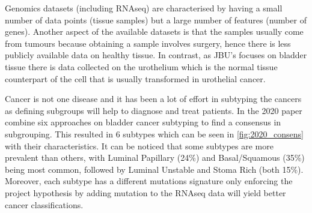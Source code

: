 Genomics datasets (including RNAseq) are characterised by having a small number of data points (tissue samples) but a large number of features (number of genes). Another aspect of the available datasets is that the samples usually come from tumours because obtaining a sample involves surgery, hence there is less publicly available data on healthy tissue. In contrast, as JBU's focuses on bladder tissue there is data collected on the urothelium which is the normal tissue counterpart of the cell that is usually transformed in urothelial cancer.

Cancer is not one disease and it has been a lot of effort in subtyping the cancers as defining subgroups will help to diagnose and treat patients. In the 2020 paper \citet{Kamoun2020-tj} combine six approaches \cite{Mo2018-rl, Damrauer2014-tc, Choi2014-ed, Marzouka2018-ge, Rebouissou2014-ep,Robertson2017-mg} on bladder cancer subtyping to find a consensus in subgrouping. This resulted in 6 subtypes which can be seen in \cref{fig:2020_consens} with their characteristics. It can be noticed that some subtypes are more prevalent than others, with Luminal Papillary (24\%) and Basal/Squamous (35\%) being most common, followed by Luminal Unstable and Stoma Rich (both 15\%). Moreover, each subtype has a different mutations signature only enforcing the project hypothesis by adding mutation to the RNAseq data will yield better cancer classifications.

